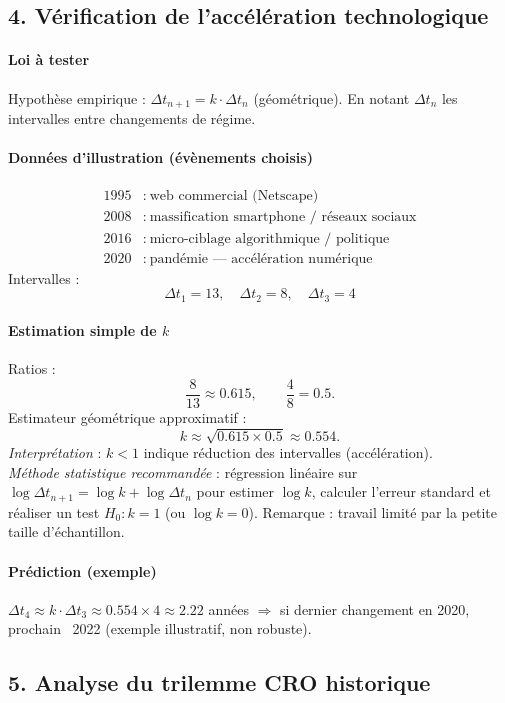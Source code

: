 \documentclass[11pt,a4paper]{article}
\begin{document}
\subsection{4. Vérification de l'accélération technologique}
\paragraph{Loi à tester}
Hypothèse empirique : \(\Delta t_{n+1} = k\cdot \Delta t_n\) (géométrique). En notant $\Delta t_n$ les intervalles entre changements de régime.

\paragraph{Données d'illustration (évènements choisis)}
\[
\begin{aligned}
1995 &:\ \text{web commercial (Netscape)}\\
2008 &:\ \text{massification smartphone / réseaux sociaux}\\
2016 &:\ \text{micro-ciblage algorithmique / politique}\\
2020 &:\ \text{pandémie — accélération numérique}
\end{aligned}
\]
Intervalles :
\[
\Delta t_1 = 13,\quad \Delta t_2 = 8,\quad \Delta t_3 = 4
\]

\paragraph{Estimation simple de $k$}
Ratios :
\[
\frac{8}{13}\approx 0.615,\qquad \frac{4}{8}=0.5.
\]
Estimateur géométrique approximatif :
\[
k \approx \sqrt{0.615\times 0.5}\approx 0.554.
\]
\textit{Interprétation} : $k<1$ indique réduction des intervalles (accélération).\\
\textit{Méthode statistique recommandée} : régression linéaire sur $\log\Delta t_{n+1} = \log k + \log\Delta t_n$ pour estimer $\log k$, calculer l'erreur standard et réaliser un test $H_0:k=1$ (ou $\log k=0$). Remarque : travail limité par la petite taille d'échantillon.

\paragraph{Prédiction (exemple)}
$\Delta t_4 \approx k\cdot \Delta t_3 \approx 0.554\times 4 \approx 2.22$ années $\Rightarrow$ si dernier changement en 2020, prochain ~2022 (exemple illustratif, non robuste).

\subsection{5. Analyse du trilemme CRO historique}
\end{document}
